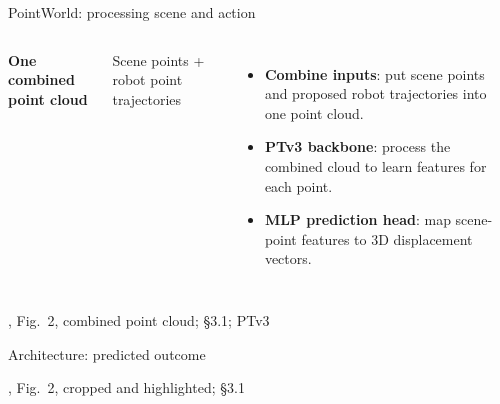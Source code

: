 \documentclass[aspectratio=169,12pt]{beamer}
\newcommand{\credit}[1]{\par\hfill{\tiny\color{mute}\citet{huang2026pointworld}, #1}\par}
\begin{document}
\begin{frame}{PointWorld: processing scene and action}
  \begin{columns}[c]
      \centering
      {\small\bfseries\color{pw}One combined point cloud}\par
      \vspace{5pt}
      \par
      \vspace{8pt}
      {\footnotesize Scene points + robot point trajectories}\par
      \footnotesize
      \begin{itemize}\setlength{\itemsep}{14pt}
        \item<1-> \textbf{Combine inputs}: put scene points and proposed robot trajectories into one point cloud.
        \item<2-> \textbf{PTv3 backbone}: process the combined cloud to learn features for each point.
        \item<3-> \textbf{MLP prediction head}: map scene-point features to 3D displacement vectors.
      \end{itemize}
  \end{columns}
  \vfill
  \credit{Fig.~2, combined point cloud; \S3.1; PTv3 \citep{wu2023ptv3}}
\end{frame}

\begin{frame}{Architecture: predicted outcome}
  \centering
  \credit{Fig.~2, cropped and highlighted; \S3.1}
\end{frame}
\end{document}
